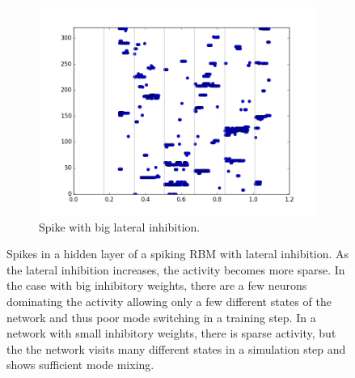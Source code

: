 \begin{figure}[h!]
	\begin{subfigure}[t]{.55\textwidth}
  		\centering
  		\includegraphics[width=.9\linewidth]{imgs/app/inhib_big.png}
  		\caption{Spike with big lateral inhibition.}
  		\label{fig:sub2}
	\end{subfigure}
	\caption{Spikes in a hidden layer of a spiking RBM with lateral inhibition. As the lateral inhibition increases, the activity becomes more sparse. In the case with big inhibitory weights, there are a few neurons dominating the activity allowing only a few different states of the network and thus poor mode switching in a training step. In a network with small inhibitory weights, there is sparse activity, but the the network visits many different states in a simulation step and shows sufficient mode mixing. }
	\label{fig:dbnmixing}
\end{figure}
   
